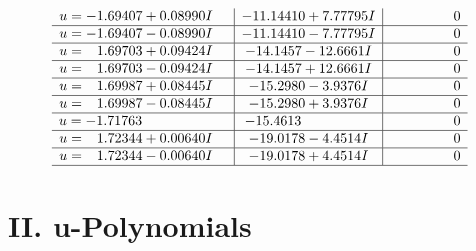 \documentclass[1p]{elsarticle_modified}
\theoremstyle{definition}
\begin{document}
$$\begin{array}{c|c|c}
\begin{aligned}
u &= -1.69407 + 0.08990 I\end{aligned}
 & -11.14410 + 7.77795 I & \phantom{-0.000000 } 0 \\ \hline\begin{aligned}
u &= -1.69407 - 0.08990 I\end{aligned}
 & -11.14410 - 7.77795 I & \phantom{-0.000000 } 0 \\ \hline\begin{aligned}
u &= \phantom{-}1.69703 + 0.09424 I\end{aligned}
 & -14.1457 - 12.6661 I & \phantom{-0.000000 } 0 \\ \hline\begin{aligned}
u &= \phantom{-}1.69703 - 0.09424 I\end{aligned}
 & -14.1457 + 12.6661 I & \phantom{-0.000000 } 0 \\ \hline\begin{aligned}
u &= \phantom{-}1.69987 + 0.08445 I\end{aligned}
 & -15.2980 - 3.9376 I & \phantom{-0.000000 } 0 \\ \hline\begin{aligned}
u &= \phantom{-}1.69987 - 0.08445 I\end{aligned}
 & -15.2980 + 3.9376 I & \phantom{-0.000000 } 0 \\ \hline\begin{aligned}
u &= -1.71763\phantom{ +0.000000I}\end{aligned}
 & -15.4613\phantom{ +0.000000I} & \phantom{-0.000000 } 0 \\ \hline\begin{aligned}
u &= \phantom{-}1.72344 + 0.00640 I\end{aligned}
 & -19.0178 - 4.4514 I & \phantom{-0.000000 } 0 \\ \hline\begin{aligned}
u &= \phantom{-}1.72344 - 0.00640 I\end{aligned}
 & -19.0178 + 4.4514 I & \phantom{-0.000000 } 0\\
 \hline 
 \end{array}$$\newpage
\newpage\renewcommand{\arraystretch}{1}
\centering \section*{ II. u-Polynomials}
\end{document}
